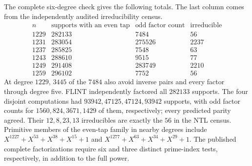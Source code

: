 \documentclass[11pt]{article}
\begin{document}
The complete six-degree check gives the following totals. The last
column comes from the independently audited irreducibility census.
\[
\begin{array}{r|r|r|r}
 n&\text{supports with an even tap}&\text{odd factor count}&\text{irreducible}\\\hline
 1229&282133&7484&56\\1231&283054&275526&2237\\
 1237&285825&7548&63\\1243&288610&9515&77\\
 1249&291408&283749&2210\\1259&296102&7752&56
\end{array}
\]
At degree \(1229\), \(3445\) of the \(7484\) also avoid inverse
pairs and every factor through degree five. FLINT independently
factored all \(282133\) supports. The four disjoint computations
had \(93942,47125,47124,93942\) supports, with odd factor counts
for \(1560,824,3671,1429\) of them, respectively; every predicted
parity agreed. Their \(12,8,23,13\) irreducibles are exactly the
\(56\) in the NTL census. Primitive members of the even-tap family
in nearby degrees include \(X^{1227}+X^{53}+X^{38}+X^{15}+1\)
and \(X^{1277}+X^{63}+X^{34}+X^{29}+1\). The published complete
factorizations require six and three distinct prime-index tests,
respectively, in addition to the full power.
\end{document}

